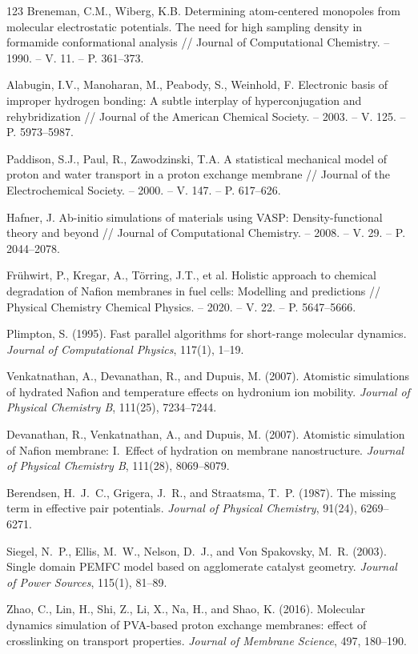 \documentclass[12pt,a4paper]{report}
\begin{document}
\begin{thebibliography}{123}
 Breneman, C.M., Wiberg, K.B. Determining atom-centered monopoles from molecular electrostatic potentials. The need for high sampling density in formamide conformational analysis // Journal of Computational Chemistry. – 1990. – V. 11. – P. 361–373.

 Alabugin, I.V., Manoharan, M., Peabody, S., Weinhold, F. Electronic basis of improper hydrogen bonding: A subtle interplay of hyperconjugation and rehybridization // Journal of the American Chemical Society. – 2003. – V. 125. – P. 5973–5987.

 Paddison, S.J., Paul, R., Zawodzinski, T.A. A statistical mechanical model of proton and water transport in a proton exchange membrane // Journal of the Electrochemical Society. – 2000. – V. 147. – P. 617–626.

 Hafner, J. Ab-initio simulations of materials using VASP: Density-functional theory and beyond // Journal of Computational Chemistry. – 2008. – V. 29. – P. 2044–2078.

 Frühwirt, P., Kregar, A., Törring, J.T., et al. Holistic approach to chemical degradation of Nafion membranes in fuel cells: Modelling and predictions // Physical Chemistry Chemical Physics. – 2020. – V. 22. – P. 5647–5666.

 Plimpton, S. (1995). Fast parallel algorithms for short-range molecular dynamics. \textit{Journal of Computational Physics}, 117(1), 1–19.

 Venkatnathan, A., Devanathan, R., and Dupuis, M. (2007). Atomistic simulations of hydrated Nafion and temperature effects on hydronium ion mobility. \textit{Journal of Physical Chemistry B}, 111(25), 7234–7244.

 Devanathan, R., Venkatnathan, A., and Dupuis, M. (2007). Atomistic simulation of Nafion membrane: I.\ Effect of hydration on membrane nanostructure. \textit{Journal of Physical Chemistry B}, 111(28), 8069–8079.

 Berendsen, H.~J.~C., Grigera, J.~R., and Straatsma, T.~P. (1987). The missing term in effective pair potentials. \textit{Journal of Physical Chemistry}, 91(24), 6269–6271.

 Siegel, N.~P., Ellis, M.~W., Nelson, D.~J., and Von Spakovsky, M.~R. (2003). Single domain PEMFC model based on agglomerate catalyst geometry. \textit{Journal of Power Sources}, 115(1), 81–89.

 Zhao, C., Lin, H., Shi, Z., Li, X., Na, H., and Shao, K. (2016). Molecular dynamics simulation of PVA-based proton exchange membranes: effect of crosslinking on transport properties. \textit{Journal of Membrane Science}, 497, 180–190.


\end{thebibliography}
\end{document}

